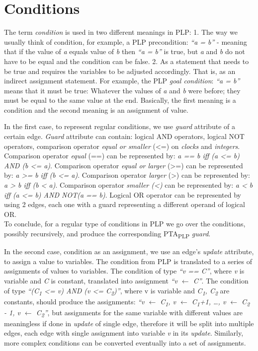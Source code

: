\section{Conditions \label{plp_to_pta_conditions}}
The term \textit{condition} is used in two different meanings in PLP: 1. The way we usually think of condition, for example, a PLP precondition: \textit{“a = b”} - meaning that if the value of \textit{a} equals value of \textit{b} then \textit{“a = b”} is true, but \textit{a} and \textit{b} do not have to be equal and the condition can be false. 2. As a statement that needs to be true and requires the variables to be adjusted accordingly. That is, as an indirect assignment statement. For example, the PLP \textit{\textit{goal condition}}: \textit{“a = b”} means that it must be true: Whatever the values of \textit{a} and \textit{b} were before; they must be equal to the same value at the end. Basically, the first meaning is a condition and the second meaning is an assignment of value. 
\par In the first case, to represent regular conditions, we use \textit{guard} attribute of a certain edge. \textit{Guard} attribute can contain: logical AND operators, logical NOT operators, comparison operator \textit{equal or smaller} (<=) on \textit{\textit{clocks}} and \textit{integers}. Comparison operator \textit{equal} (==) can be represented by: \textit{a == b iff (a <= b) AND (b <= a)}. Comparison operator \textit{equal or larger} (>=) can be represented by: \textit{a >= b iff (b <= a)}. Comparison operator \textit{larger} (>) can be represented by: \textit{a > b iff (b < a)}. Comparison operator \textit{smaller (<)} can be represented by: \textit{a < b iff (a <= b) AND NOT(a == b)}. Logical OR operator can be represented by using 2 edges, each one with a guard representing a different operand of logical OR.\\
To conclude, for a regular type of conditions in PLP we go over the conditions, possibly recursively, and produce the corresponding PTA\textsubscript{PLP} \textit{guard}.
\par In the second case, condition as an assignment, we use an edge’s \textit{update} attribute, to assign a value to variables. The condition from PLP is translated to a series of assignments of values to variables. The condition of type \textit{“v == C”}, where \textit{v} is variable and \textit{C} is constant, translated into assignment \textit{“v $\leftarrow$ C”}. The condition of type \textit{“(C\textsubscript{1} <= v) AND (v <= C\textsubscript{2})”}, where v is variable and \textit{C\textsubscript{1}, C\textsubscript{2}} are constants, should produce the assignments: \textit{“v $\leftarrow$ C\textsubscript{1}, v $\leftarrow$ C\textsubscript{1}+1, …, v $\leftarrow$ C\textsubscript{2} - 1, v $\leftarrow$ C\textsubscript{2}”}, but assignments for the same variable with different values are meaningless if done in \textit{update} of single edge, therefore it will be split into multiple edges, each edge with single assignment into variable \textit{v} in its \textit{update}. Similarly, more complex conditions can be converted eventually into a set of assignments. \\
